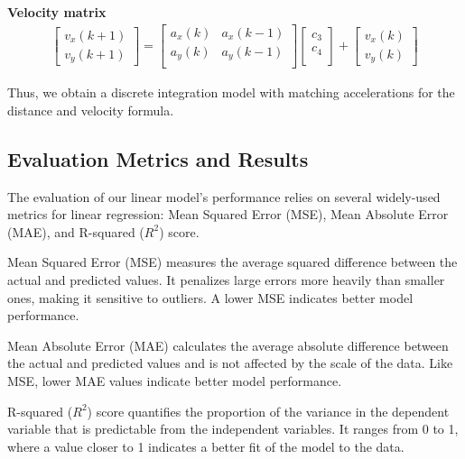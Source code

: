 \hfil

\textbf{Velocity matrix}
\begin{align}
\label{eq:velocity_matrix}
    \begin{bmatrix}
        v_x(k+1) \\ 
        v_y(k+1) 
    \end{bmatrix}
    =
    \begin{bmatrix}
        a_x(k) & a_x(k-1)    \\ 
        a_y(k) & a_y(k-1)    \\
    \end{bmatrix}
    \begin{bmatrix}
        c_3 \\
        c_4 \\
   \end{bmatrix}
    +
    \begin{bmatrix}
        v_x(k) \\
        v_y(k) 
    \end{bmatrix}
\end{align}


Thus, we obtain a discrete integration model with matching accelerations for the distance and velocity formula.

\subsection{Evaluation Metrics and Results}

The evaluation of our linear model's performance relies on several widely-used metrics for linear regression: Mean Squared Error (MSE), Mean Absolute Error (MAE), and R-squared ($R^2$) score.

Mean Squared Error (MSE) measures the average squared difference between the actual and predicted values. It penalizes large errors more heavily than smaller ones, making it sensitive to outliers. A lower MSE indicates better model performance.

Mean Absolute Error (MAE) calculates the average absolute difference between the actual and predicted values and is 
not affected by the scale of the data. Like MSE, lower MAE values indicate better model performance.

R-squared ($R^2$) score quantifies the proportion of the variance in the dependent variable that is predictable 
from the independent variables. 
It ranges from 0 to 1, where a value closer to 1 indicates a better fit of the model to the data. 

